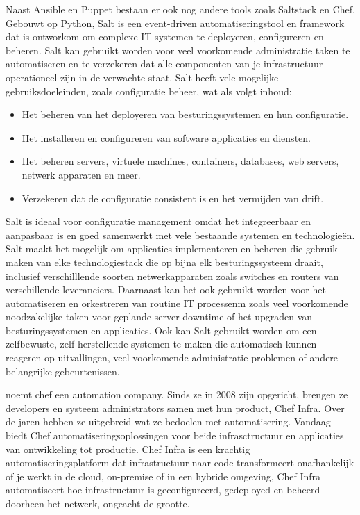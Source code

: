Naast Ansible en Puppet bestaan er ook nog andere tools zoals Saltstack en Chef.
Gebouwt op Python, Salt is een event-driven automatiseringstool en framework dat is ontworkom om complexe IT systemen te deployeren, configureren en beheren. Salt kan gebruikt worden voor veel voorkomende administratie taken te automatiseren en te verzekeren dat alle componenten van je infrastructuur operationeel zijn in de verwachte staat.
Salt heeft vele mogelijke gebruiksdoeleinden, zoals configuratie beheer, wat als volgt inhoud:
\begin{itemize}
  \item Het beheren van het deployeren van besturingssystemen en hun configuratie.
  \item Het installeren en configureren van software applicaties en diensten.
  \item Het beheren servers, virtuele machines, containers, databases, web servers, netwerk apparaten en meer.
  \item Verzekeren dat de configuratie consistent is en het vermijden van drift.
\end{itemize}

Salt is ideaal voor configuratie management omdat het integreerbaar en aanpasbaar is en goed samenwerkt met vele bestaande systemen en technologieën. Salt maakt het mogelijk om applicaties implementeren en beheren die gebruik maken van elke technologiestack die op bijna elk besturingssysteem draait, inclusief verschilllende soorten netwerkapparaten zoals switches en routers van verschillende leveranciers.
Daarnaast kan het ook gebruikt worden voor het automatiseren en orkestreren van routine IT processenm zoals veel voorkomende noodzakelijke taken voor geplande server downtime of het upgraden van besturingssystemen en applicaties. 
Ook kan Salt gebruikt worden om een zelfbewuste, zelf herstellende systemen te maken die automatisch kunnen reageren op uitvallingen, veel voorkomende administratie problemen of andere belangrijke gebeurtenissen. \autocite{Saltstack} \break

\textcite{Chef} noemt chef een automation company. Sinds ze in 2008 zijn opgericht, brengen ze developers en systeem administrators samen met hun product, Chef Infra. Over de jaren hebben ze uitgebreid wat ze bedoelen met automatisering. Vandaag biedt Chef automatiseringsoplossingen voor beide infrasctructuur en applicaties van ontwikkeling tot productie.
Chef Infra is een krachtig automatiseringsplatform dat infrastructuur naar code transformeert onafhankelijk of je werkt in de cloud, on-premise of in een hybride omgeving, Chef Infra automatiseert hoe infrastructuur is geconfigureerd, gedeployed en beheerd doorheen het netwerk, ongeacht de grootte.

